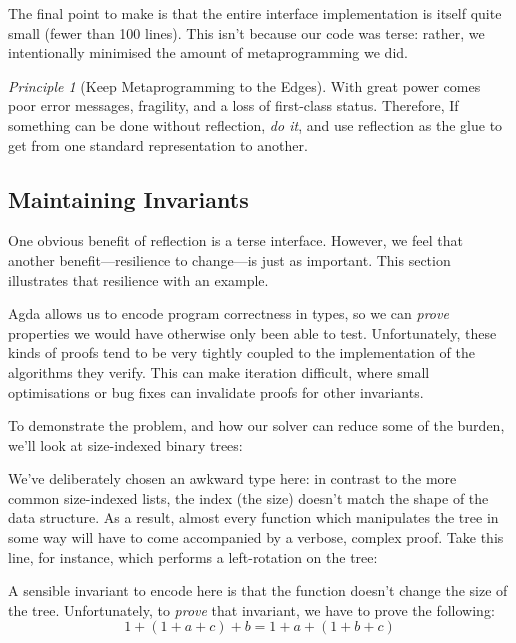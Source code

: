 \documentclass[acmsmall]{acmart}\settopmatter{printfolios=true,printccs=false,printacmref=false}
\theoremstyle{remark}
\newtheorem{principle}{Principle}
\begin{document}
The final point to make is that the entire interface implementation is itself
quite small (fewer than 100 lines). This isn't because our code was terse:
rather, we intentionally minimised the amount of metaprogramming we did.

\begin{principle}[Keep Metaprogramming to the Edges] With great power comes poor
  error messages, fragility, and a loss of first-class status. Therefore, If
  something can be done without reflection, \emph{do it}, and use reflection as
  the glue to get from one standard representation to another.
\end{principle}
\subsection{Maintaining Invariants}
One obvious benefit of reflection is a terse interface. However, we feel that
another benefit---resilience to change---is just as important. This section
illustrates that resilience with an example.

Agda allows us to encode program correctness in types, so we can \emph{prove}
properties we would have otherwise only been able to test. Unfortunately, these
kinds of proofs tend to be very tightly coupled to the implementation of the
algorithms they verify. This can make iteration difficult, where small
optimisations or bug fixes can invalidate proofs for other invariants.

To demonstrate the problem, and how our solver can reduce some of the burden,
we'll look at size-indexed binary trees:
\begin{center}
\end{center}

We've deliberately chosen an awkward type here: in contrast to the more common
size-indexed lists, the index (the size) doesn't match the shape of the data
structure. As a result, almost every function which manipulates the tree in some
way will have to come accompanied by a verbose, complex proof. Take this line,
for instance, which performs a left-rotation on the tree:
\begin{center}
\end{center}

A sensible invariant to encode here is that the function doesn't change the size
of the tree. Unfortunately, to \emph{prove} that invariant, we have to prove the
following:
\[1 + (1 + a + c) + b = 1 + a + (1 + b + c)\]
\end{document}
